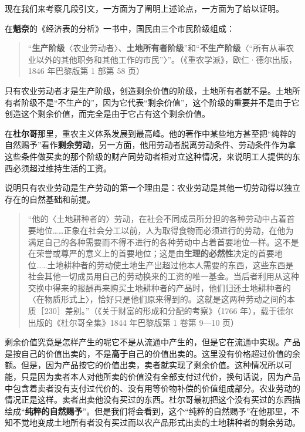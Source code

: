 
现在我们来考察几段引文，一方面为了阐明上述论点，一方面为了给以证明。

在\textbf{魁奈}的《经济表的分析》一书中，国民由三个市民阶级组成：

\begin{quote}“\textbf{生产阶级}〈农业劳动者〉、\textbf{土地所有者阶级}”和“\textbf{不生产阶级}〈“所有从事农业以外的其他职务和其他工作的市民”〉”。（《重农学派》，欧仁·德尔出版，1846 年巴黎版第 1 部第 58 页）\end{quote}

只有农业劳动者才是生产阶级，创造剩余价值的阶级，土地所有者就不是。土地所有者阶级不是“不生产的”，因为它代表“剩余价值”，这个阶级的重要并不是由于它创造这个剩余价值，而完全是由于它占有这个剩余价值。

在\textbf{杜尔哥}那里，重农主义体系发展到最高峰。他的著作中某些地方甚至把“纯粹的自然赐予”看作\textbf{剩余劳动}，另一方面，他用劳动者脱离劳动条件、劳动条件作为拿这些条件做买卖的那个阶级的财产同劳动者相对立这种情况，来说明工人提供的东西必须超过维持生活的工资。

说明只有农业劳动是生产劳动的第一个理由是：农业劳动是其他一切劳动得以独立存在的自然基础和前提。

\begin{quote}“他的〈土地耕种者的〉劳动，在社会不同成员所分担的各种劳动中占着首要地位……正象在社会分工以前，人为取得食物而必须进行的劳动，在他为满足自己的各种需要而不得不进行的各种劳动中占着首要地位一样。这不是在荣誉或尊严的意义上的首要地位；这是由\textbf{生理的必然性}决定的首要地位……土地耕种者的劳动使土地生产出超过他本人需要的东西，这些东西是社会其他一切成员用自己的劳动换来的工资的唯一基金。当后者利用从这种交换中得来的报酬再来购买土地耕种者的产品时，他们归还土地耕种者的〈在物质形式上〉，恰好只是他们原来得到的。这就是这两种劳动之间的本质［230］差别。”（《关于财富的形成和分配的考察》（1766 年），载于德尔出版的《杜尔哥全集》1844 年巴黎版第 1 卷第 9—10 页）\end{quote}

剩余价值究竟是怎样产生的呢它不是从流通中产生的，但是它在流通中实现。产品是按自己的价值出卖的，不是\textbf{高于}自己的价值出卖的。这里没有价格超过价值的余额。但是，因为产品按它的价值出卖，卖者就实现了剩余价值。这种情况所以可能，只是因为卖者本人对他所卖的价值没有全部支付过代价，换句话说，因为产品中包含着卖者没有支付过代价的、没有用等价物补偿的价值组成部分。农业劳动的情况正是这样。卖者出卖他没有买过的东西。杜尔哥最初把这个没有买过的东西描绘成“\textbf{纯粹的自然赐予}”。但是我们将会看到，这个“纯粹的自然赐予”在他那里，不知不觉地变成土地所有者没有买过而以农产品形式出卖的土地耕种者的剩余劳动。

